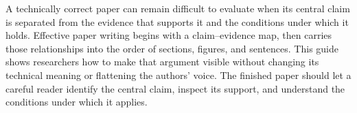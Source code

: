 A technically correct paper can remain difficult to evaluate when its central
claim is separated from the evidence that supports it and the conditions under
which it holds. Effective paper writing begins with a claim--evidence map, then
carries those relationships into the order of sections, figures, and
sentences. This guide shows researchers how to make that argument visible
without changing its technical meaning or flattening the authors' voice. The
finished paper should let a careful reader identify the central claim, inspect
its support, and understand the conditions under which it applies.
